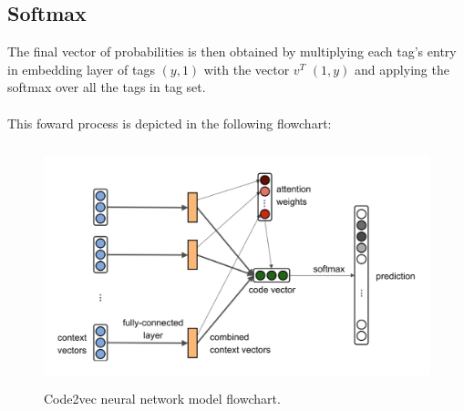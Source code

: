 \documentclass[10pt,english,a4paper]{report}
\begin{document}
\subsection{Softmax}
The final vector of probabilities is then obtained by multiplying each tag's entry in
embedding layer of tags $(y, 1)$ with the vector $v^T$ $(1,y)$ and applying the softmax
over all the tags in tag set. \\ \\
This foward process is depicted in the following flowchart:

\begin{figure}[H]
    \centering
    \includegraphics[width=12cm, height=7cm]{figures/code2vec_model_visual.png}
    \caption{Code2vec \cite{code2vec} neural network model flowchart.}
    \label{fig:code2vec_model_visual}
\end{figure}
\end{document}
